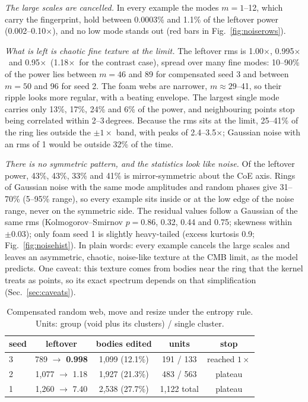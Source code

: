\documentclass[aps,prd,twocolumn,nofootinbib,superscriptaddress,floatfix]{revtex4-2}
\newcommand{\fl}{\ensuremath{\times}}
\begin{document}
\emph{The large scales are cancelled.} In every example the modes $m=1$--12, which carry the fingerprint, hold between 0.0003\% and 1.1\% of the leftover power (0.002--0.10\fl), and no low mode stands out (red bars in Fig.~\ref{fig:noiserows}).

\emph{What is left is chaotic fine texture at the limit.} The leftover rms is 1.00\fl, 0.995\fl\ and 0.95\fl\ (1.18\fl\ for the contrast case), spread over many fine modes: 10--90\% of the power lies between $m=46$ and 89 for compensated seed 3 and between $m=50$ and 96 for seed 2. The foam webs are narrower, $m\approx29$--41, so their ripple looks more regular, with a beating envelope. The largest single mode carries only 13\%, 17\%, 24\% and 6\% of the power, and neighbouring points stop being correlated within 2--3\,degrees. Because the rms sits at the limit, 25--41\% of the ring lies outside the $\pm1\times$ band, with peaks of 2.4--3.5\fl; Gaussian noise with an rms of 1 would be outside 32\% of the time.

\emph{There is no symmetric pattern, and the statistics look like noise.} Of the leftover power, 43\%, 43\%, 33\% and 41\% is mirror-symmetric about the CoE axis. Rings of Gaussian noise with the same mode amplitudes and random phases give 31--70\% (5--95\% range), so every example sits inside or at the low edge of the noise range, never on the symmetric side. The residual values follow a Gaussian of the same rms (Kolmogorov--Smirnov $p=0.86$, 0.32, 0.44 and 0.75; skewness within $\pm0.03$); only foam seed 1 is slightly heavy-tailed (excess kurtosis 0.9; Fig.~\ref{fig:noisehist}). In plain words: every example cancels the large scales and leaves an asymmetric, chaotic, noise-like texture at the CMB limit, as the model predicts. One caveat: this texture comes from bodies near the ring that the kernel treats as points, so its exact spectrum depends on that simplification (Sec.~\ref{sec:caveats}).

\begin{table}[tbp]
\caption{Compensated random web, move and resize under the entropy rule. Units: group (void plus its clusters) / single cluster.}
\label{tab:compweb}
\footnotesize
\begin{ruledtabular}
\begin{tabular}{lcccc}
seed & leftover & bodies edited & units & stop\\
\midrule
3 & 789 $\to$ \textbf{0.998} & 1,099 (12.1\%) & 191 / 133 & reached $1\times$\\
2 & 1,077 $\to$ 1.18 & 1,927 (21.3\%) & 483 / 563 & plateau\\
1 & 1,260 $\to$ 7.40 & 2,538 (27.7\%) & 1,122 total & plateau\\
\end{tabular}
\end{ruledtabular}
\end{table}
\end{document}

